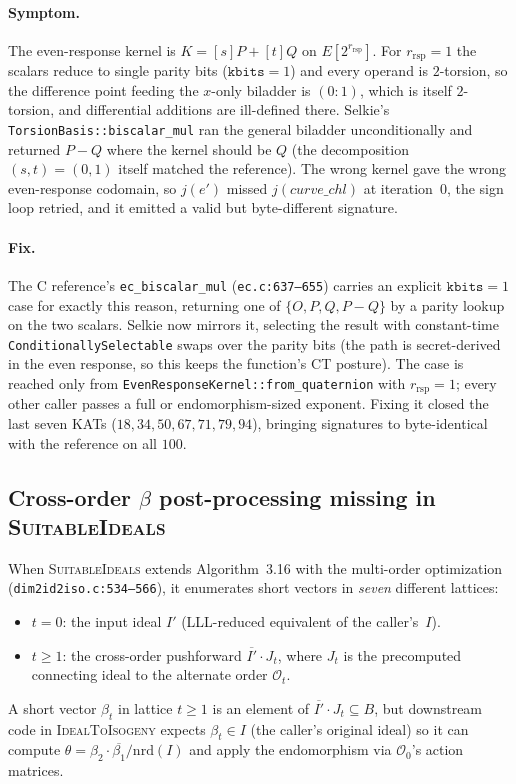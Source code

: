 \paragraph{Symptom.} The even-response kernel is $K = [s]P + [t]Q$ on
$E[2^{r_{\mathrm{rsp}}}]$. For $r_{\mathrm{rsp}} = 1$ the scalars reduce
to single parity bits ($\texttt{kbits} = 1$) and every operand is
$2$-torsion, so the difference point feeding the $x$-only biladder is
$(0 : 1)$, which is itself $2$-torsion, and differential additions are
ill-defined there. Selkie's \texttt{TorsionBasis::biscalar\_mul} ran
the general biladder unconditionally and returned $P - Q$ where the
kernel should be $Q$ (the decomposition $(s, t) = (0, 1)$ itself matched
the reference). The wrong kernel gave the wrong even-response codomain,
so $j(e')$ missed $j(\mathit{curve\_chl})$ at iteration~0, the sign loop
retried, and it emitted a valid but byte-different signature.

\paragraph{Fix.} The C reference's \texttt{ec\_biscalar\_mul}
(\texttt{ec.c:637--655}) carries an explicit $\texttt{kbits} = 1$ case
for exactly this reason, returning one of $\{O, P, Q, P-Q\}$ by a parity
lookup on the two scalars. Selkie now mirrors it, selecting the result
with constant-time \texttt{ConditionallySelectable} swaps over the
parity bits (the path is secret-derived in the even response, so this
keeps the function's CT posture). The case is reached only from
\texttt{EvenResponseKernel::from\_quaternion} with $r_{\mathrm{rsp}} =
1$; every other caller passes a full or endomorphism-sized exponent.
Fixing it closed the last seven KATs ($18, 34, 50, 67, 71, 79, 94$),
bringing signatures to byte-identical with the reference on all $100$.

\subsection{Cross-order $\beta$ post-processing missing in
  \textsc{SuitableIdeals}}
\label{sec:bug-cross-order-pp}

When \textsc{SuitableIdeals} extends Algorithm~3.16 with the
multi-order optimization (\texttt{dim2id2iso.c:534--566}), it
enumerates short vectors in \emph{seven} different lattices:
\begin{itemize}
\item $t = 0$: the input ideal $I'$ (LLL-reduced equivalent of
  the caller's~$I$).
\item $t \geq 1$: the cross-order pushforward
  $\overline{I'} \cdot J_t$, where $J_t$ is the precomputed
  connecting ideal to the alternate order $\mathcal{O}_t$.
\end{itemize}
A short vector $\beta_t$ in lattice $t \geq 1$ is an element of
$\overline{I'} \cdot J_t \subseteq B$, but downstream code in
\textsc{IdealToIsogeny} expects $\beta_t \in I$ (the caller's
original ideal) so it can compute $\theta = \beta_2 \cdot
\overline{\beta_1} / \mathrm{nrd}(I)$ and apply the
endomorphism via $\mathcal{O}_0$'s action matrices.

